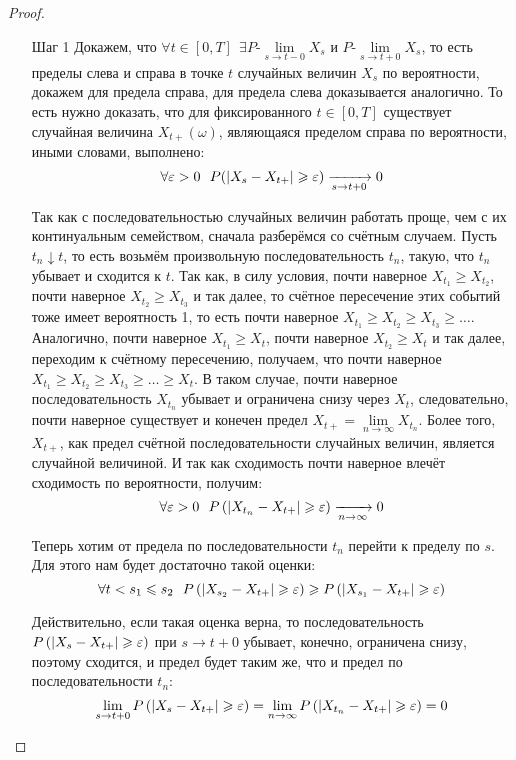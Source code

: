 \begin{proof}~
    \begin{itemize}
        \item[Шаг 1] Докажем, что $\forall t \in [0, T] \ \ \exists P\text{-}\lim\limits_{s \to t-0} X_s \text{ и } P\text{-}\lim\limits_{s \to t+0} X_s$, то есть пределы слева и справа в точке $t$ случайных величин $X_s$ по вероятности, докажем для предела справа, для предела слева доказывается аналогично. То есть нужно доказать, что для фиксированного $t \in [0, T]$ существует случайная величина $X_{t+}(\omega)$, являющаяся пределом справа по вероятности, иными словами, выполнено:
        \[
            \forall \varepsilon > 0 \ \ P(|X_s - X_{t+}| \geqslant \varepsilon) \xrightarrow[s \to t+0]{} 0
        \]

        Так как с последовательностью случайных величин работать проще, чем с их континуальным семейством, сначала разберёмся со счётным случаем. Пусть $t_n \downarrow t$, то есть возьмём произвольную последовательность $t_n$, такую, что $t_n$ убывает и сходится к $t$. Так как, в силу условия, почти наверное $X_{t_1} \ge X_{t_2}$, почти наверное $X_{t_2} \ge X_{t_3}$ и так далее, то счётное пересечение этих событий тоже имеет вероятность 1, то есть почти наверное $X_{t_1} \ge X_{t_2} \ge X_{t_3} \ge \dots$. Аналогично, почти наверное $X_{t_1} \ge X_t$, почти наверное $X_{t_2} \ge X_t$ и так далее, переходим к счётному пересечению, получаем, что почти наверное $X_{t_1} \ge X_{t_2} \ge X_{t_3} \ge \dots \ge X_t$. В таком случае, почти наверное последовательность $X_{t_n}$ убывает и ограничена снизу через $X_t$, следовательно, почти наверное существует и конечен предел $X_{t+} = \lim\limits_{n \to \infty} X_{t_n}$. Более того, $X_{t+}$, как предел счётной последовательности случайных величин, является случайной величиной. И так как сходимость почти наверное влечёт сходимость по вероятности, получим:
        \[
            \forall \varepsilon > 0 \ \ P\left(|X_{t_n} - X_{t+}| \geqslant \varepsilon\right) \xrightarrow[n \to \infty]{} 0
        \]
        
        Теперь хотим от предела по последовательности $t_n$ перейти к пределу по $s$. Для этого нам будет достаточно такой оценки:
        \[
            \forall t < s_1 \leqslant s_2 \ \ P\left(|X_{s_2} - X_{t+}| \geqslant \varepsilon\right) \geqslant P\left(|X_{s_1} - X_{t+}| \geqslant \varepsilon\right)
        \]

        Действительно, если такая оценка верна, то последовательность $P\left(|X_s - X_{t+}| \geqslant \varepsilon\right)$ при $s \to t+0$ убывает, конечно, ограничена снизу, поэтому сходится, и предел будет таким же, что и предел по последовательности $t_n$:
        \[
            \lim_{s \to t+0} P\left(|X_s - X_{t+}| \geqslant \varepsilon\right) = \lim_{n \to \infty} P\left(|X_{t_n} - X_{t+}| \geqslant \varepsilon\right) = 0
        \]


\end{itemize}
\end{proof}
